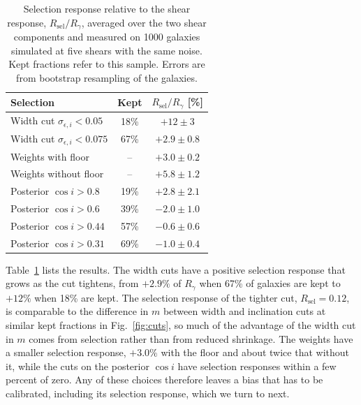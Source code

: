 \begin{table}
\centering
\caption{Selection response relative to the shear response, $R_\mathrm{sel}/R_\gamma$, averaged over the two shear components and measured on 1000 galaxies simulated at five shears with the same noise. Kept fractions refer to this sample. Errors are from bootstrap resampling of the galaxies.}
\label{tab:selection}
\begin{tabular}{lcc}
\toprule
Selection & Kept & $R_\mathrm{sel}/R_\gamma$ [\%] \\
\midrule
Width cut $\sigma_{\epsilon,i} < 0.05$ & 18\% & $+12 \pm 3$ \\
Width cut $\sigma_{\epsilon,i} < 0.075$ & 67\% & $+2.9 \pm 0.8$ \\
Weights with floor & -- & $+3.0 \pm 0.2$ \\
Weights without floor & -- & $+5.8 \pm 1.2$ \\
Posterior $\cos i > 0.8$ & 19\% & $+2.8 \pm 2.1$ \\
Posterior $\cos i > 0.6$ & 39\% & $-2.0 \pm 1.0$ \\
Posterior $\cos i > 0.44$ & 57\% & $-0.6 \pm 0.6$ \\
Posterior $\cos i > 0.31$ & 69\% & $-1.0 \pm 0.4$ \\
\bottomrule
\end{tabular}
\end{table}

Table~\ref{tab:selection} lists the results. The width cuts have a positive selection response that grows as the cut tightens, from $+2.9\%$ of $R_\gamma$ when 67\% of galaxies are kept to $+12\%$ when 18\% are kept. The selection response of the tighter cut, $R_\mathrm{sel} = 0.12$, is comparable to the difference in $m$ between width and inclination cuts at similar kept fractions in Fig.~\ref{fig:cuts}, so much of the advantage of the width cut in $m$ comes from selection rather than from reduced shrinkage. The weights have a smaller selection response, $+3.0\%$ with the floor and about twice that without it, while the cuts on the posterior $\cos i$ have selection responses within a few percent of zero. Any of these choices therefore leaves a bias that has to be calibrated, including its selection response, which we turn to next. 
